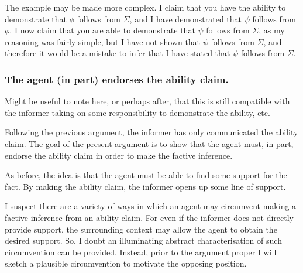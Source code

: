 \documentclass[10pt]{article}
\begin{document}
\begin{note}
  \begin{enumerate*}[label=(\roman*)]
  \item The example may be made more complex.
    I claim that you have the ability to demonstrate that \(\phi\) follows from \(\Sigma\), and I have demonstrated that \(\psi\) follows from \(\phi\).
    I now claim that you are able to demonstrate that \(\psi\) follows from \(\Sigma\), as my reasoning was fairly simple, but I have not shown that \(\psi\) follows from \(\Sigma\), and therefore it would be a mistake to infer that I have stated that \(\psi\) follows from \(\Sigma\).
  \end{enumerate*}
\end{note}

\newpage

\subsubsection{The agent (in part) endorses the ability claim.}
\label{sec:agent-in-part}

\begin{note}[Responsibility]
  Might be useful to note here, or perhaps after, that this is still compatible with the informer taking on some responsibility to demonstrate the ability, etc.
\end{note}

Following the previous argument, the informer has only communicated the ability claim.
The goal of the present argument is to show that the agent must, in part, endorse the ability claim in order to make the factive inference.

As before, the idea is that the agent must be able to find some support for the fact.
By making the ability claim, the informer opens up some line of support.

I suspect there are a variety of ways in which an agent may circumvent making a factive inference from an ability claim.
For even if the informer does not directly provide support, the surrounding context may allow the agent to obtain the desired support.
So, I doubt an illuminating abstract characterisation of such circumvention can be provided.
Instead, prior to the argument proper I will sketch a plausible circumvention to motivate the opposing position.
\end{document}
